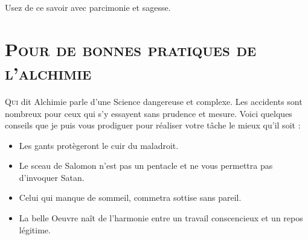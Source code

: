 
Usez de ce savoir avec parcimonie et sagesse.

\section{\textsc{Pour de bonnes pratiques de l'alchimie}}

\lettrine{Q}{ui} dit Alchimie parle d'une Science dangereuse et complexe. Les
accidents sont nombreux pour ceux qui s'y essayent sans prudence et mesure.
Voici quelques conseils que je puis vous prodiguer pour réaliser votre tâche le
mieux qu'il soit :

\begin{itemize}
    \item Les gants protègeront le cuir du maladroit.
    \item Le sceau de Salomon n'est pas un pentacle et ne vous permettra pas
        d'invoquer Satan.
    \item Celui qui manque de sommeil, commetra sottise sans pareil.
    \item La belle Oeuvre naît de l'harmonie entre un travail conscencieux et
        un repos légitime.
\end{itemize}

